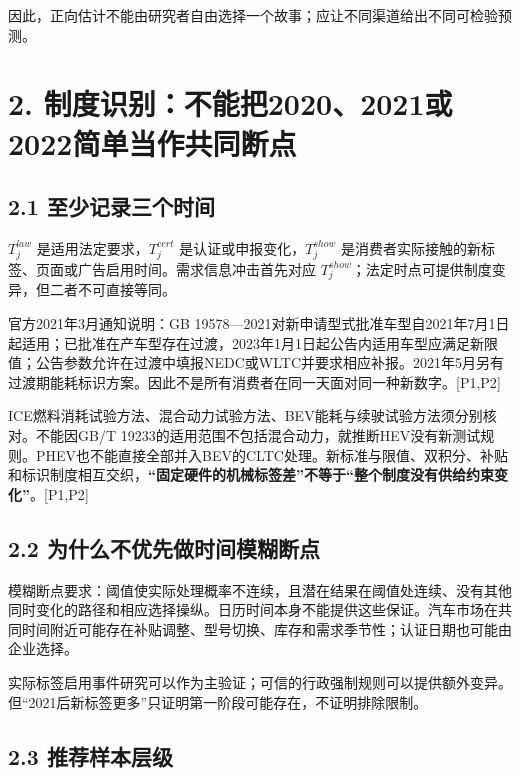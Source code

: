 \documentclass[
  11pt,
]{article}
\begin{document}
因此，正向估计不能由研究者自由选择一个故事；应让不同渠道给出不同可检验预测。

\section{2.
制度识别：不能把2020、2021或2022简单当作共同断点}\label{ux5236ux5ea6ux8bc6ux522bux4e0dux80fdux628a20202021ux62162022ux7b80ux5355ux5f53ux4f5cux5171ux540cux65adux70b9}

\subsection{2.1
至少记录三个时间}\label{ux81f3ux5c11ux8bb0ux5f55ux4e09ux4e2aux65f6ux95f4}

\(T_j^{law}\) 是适用法定要求，\(T_j^{cert}\)
是认证或申报变化，\(T_j^{show}\)
是消费者实际接触的新标签、页面或广告启用时间。需求信息冲击首先对应
\(T_j^{show}\)；法定时点可提供制度变异，但二者不可直接等同。

官方2021年3月通知说明：GB
19578---2021对新申请型式批准车型自2021年7月1日起适用；已批准在产车型存在过渡，2023年1月1日起公告内适用车型应满足新限值；公告参数允许在过渡中填报NEDC或WLTC并要求相应补报。2021年5月另有过渡期能耗标识方案。因此不是所有消费者在同一天面对同一种新数字。{[}P1,P2{]}

ICE燃料消耗试验方法、混合动力试验方法、BEV能耗与续驶试验方法须分别核对。不能因GB/T
19233的适用范围不包括混合动力，就推断HEV没有新测试规则。PHEV也不能直接全部并入BEV的CLTC处理。新标准与限值、双积分、补贴和标识制度相互交织，\textbf{``固定硬件的机械标签差''不等于``整个制度没有供给约束变化''}。{[}P1,P2{]}

\subsection{2.2
为什么不优先做时间模糊断点}\label{ux4e3aux4ec0ux4e48ux4e0dux4f18ux5148ux505aux65f6ux95f4ux6a21ux7ccaux65adux70b9}

模糊断点要求：阈值使实际处理概率不连续，且潜在结果在阈值处连续、没有其他同时变化的路径和相应选择操纵。日历时间本身不能提供这些保证。汽车市场在共同时间附近可能存在补贴调整、型号切换、库存和需求季节性；认证日期也可能由企业选择。

实际标签启用事件研究可以作为主验证；可信的行政强制规则可以提供额外变异。但``2021后新标签更多''只证明第一阶段可能存在，不证明排除限制。

\subsection{2.3
推荐样本层级}\label{ux63a8ux8350ux6837ux672cux5c42ux7ea7}
\end{document}
